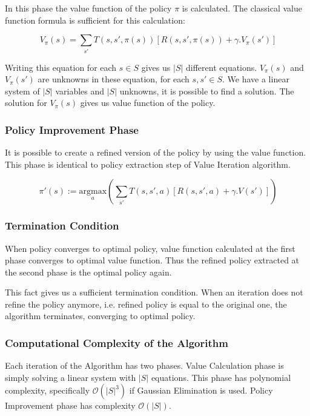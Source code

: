 In this phase the value function of the policy $\pi$ is calculated. The classical value function formula is sufficient for this calculation:

\begin{displaymath}
\ V_\pi(s) = \sum_{s'} T(s, s', \pi(s)) [ R(s, s', \pi(s)) + \gamma . V_\pi(s') ]
\end{displaymath}

Writing this equation for each $s \in S$ gives us $|S|$ different equations. $V_\pi(s)$ and $V_\pi(s')$ are unknowns in these equation, for each $s,s' \in S$. We have a linear system of $|S|$ variables and $|S|$ unknowns, it is possible to find a solution. The solution for $V_\pi(s)$ gives us value function of the policy.

\subsubsection{Policy Improvement Phase}

It is possible to create a refined version of the policy by using the value function. This phase is identical to policy extraction step of Value Iteration algorithm.

\begin{displaymath}
\ \pi'(s) := \underset{a}{\mbox{argmax}} (\sum_{s'} T(s,s',a) [ R(s,s',a) + \gamma . V(s')])
\end{displaymath}

\subsubsection{Termination Condition}

When policy converges to optimal policy, value function calculated at the first phase converges to optimal value function. Thus the refined policy extracted at the second phase is the optimal policy again.

This fact gives us a sufficient termination condition. When an iteration does not refine the policy anymore, i.e. refined policy is equal to the original one, the algorithm terminates, converging to optimal policy.

\subsubsection{Computational Complexity of the Algorithm}

Each iteration of the Algorithm has two phases. Value Calculation phase is simply solving a linear system with $|S|$ equations. This phase has polynomial complexity, specifically $\mathcal{O}(|S|^3)$ if Gaussian Elimination is used. Policy Improvement phase has complexity $\mathcal{O}(|S|)$.

